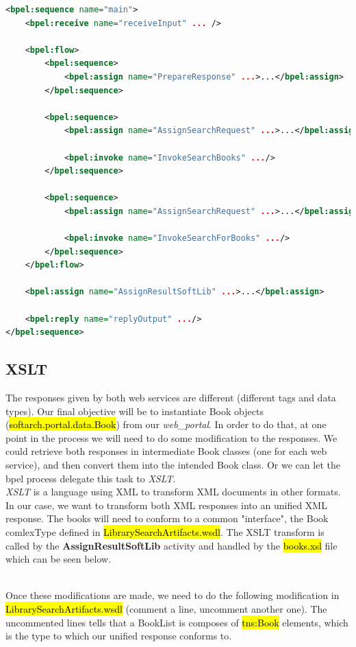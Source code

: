 \begin{lstlisting}[language=XML]
<bpel:sequence name="main">
    <bpel:receive name="receiveInput" ... />

	<bpel:flow>
        <bpel:sequence>
    		<bpel:assign name="PrepareResponse" ...>...</bpel:assign>
        </bpel:sequence>
        
        <bpel:sequence>
    		<bpel:assign name="AssignSearchRequest" ...>...</bpel:assign>

    		<bpel:invoke name="InvokeSearchBooks" .../>
        </bpel:sequence>
		
        <bpel:sequence>
    		<bpel:assign name="AssignSearchRequest" ...>...</bpel:assign>

    		<bpel:invoke name="InvokeSearchForBooks" .../>
        </bpel:sequence>
    </bpel:flow>
				
	<bpel:assign name="AssignResultSoftLib" ...>...</bpel:assign>
    
    <bpel:reply name="replyOutput" .../>
</bpel:sequence>
\end{lstlisting}

\subsection{XSLT}

The responses given by both web services are different (different tags and data
types). Our final objective will be to instantiate Book objects
(\hl{softarch.portal.data.Book}) from our \emph{web\_portal}. In order to do
that, at one point in the process we will need to do some modification to the
responses. We could retrieve both responses in intermediate Book classes (one
for each web service), and then convert them into the intended Book class. Or we
can let the bpel process delegate this task to \emph{XSLT}.\\

\emph{XSLT} is a language using XML to transform XML documents in other formats.
In our case, we want to transform both XML responses into an unified XML
response. The books will need to conform to a common "interface", the Book
comlexType defined in \hl{LibrarySearchArtifacts.wsdl}. The XSLT transform
is called by the \textbf{AssignResultSoftLib} activity and handled by the
\hl{books.xsl} file which can be seen below.\\


\

Once these modifications are made, we need to do the following modification in
\hl{LibrarySearchArtifacts.wsdl} (comment a line, uncomment another one). The
uncommented lines tells that a BookList is composes of \hl{tns:Book} elements,
which is the type to which our unified response conforms to.\\

